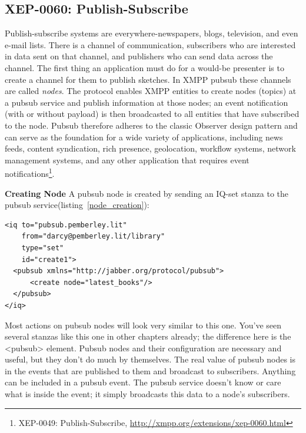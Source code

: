 \subsection{XEP-0060: Publish-Subscribe}
Publish-subscribe systems are everywhere-newspapers, blogs, television, and even e-mail lists. There is a channel
of communication, subscribers who are interested in data sent on that channel, and publishers who can send data across the channel. The first thing an application must do for a would-be presenter is to create a channel for them to publish sketches. In XMPP pubsub these channels are called \emph{nodes}. The protocol enables XMPP entities to create nodes (topics) at a pubsub service and publish information at those nodes; an event notification (with or without payload) is then broadcasted to all entities that have subscribed to the node. Pubsub therefore adheres to the classic Observer design pattern and can serve as the foundation for a wide variety of applications, including news feeds, content syndication, rich presence, geolocation, workflow systems, network management systems, and any other application that requires event notifications\footnote{XEP-0049: Publish-Subscribe, \url{http://xmpp.org/extensions/xep-0060.html}}.

\textbf{Creating Node}
\newline
A pubsub node is created by sending an IQ-set stanza to the pubsub service(listing~\ref{node_creation}):
	\begin{lstlisting}[label=node_creation,caption=PubSub Node Creation]
<iq to="pubsub.pemberley.lit"
    from="darcy@pemberley.lit/library"
    type="set"
    id="create1">
  <pubsub xmlns="http://jabber.org/protocol/pubsub">
      <create node="latest_books"/>
  </pubsub>
</iq>
		\end{lstlisting}
		Most actions on pubsub nodes will look very similar to this one. You’ve seen several stanzas like
this one in other chapters already; the difference here is the <pubsub> element. Pubsub nodes and their configuration are necessary and useful, but they don’t do much by themselves. The real value of pubsub nodes is in the events that are published to them and broadcast to subscribers. Anything can be included in a pubsub event. The pubsub service doesn’t know or care what is inside the event; it simply broadcasts this data to a node’s subscribers.

